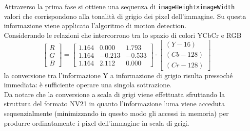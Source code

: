 Attraverso la prima fase si ottiene una sequenza di \texttt{imageHeight×imageWidth} valori che corrispondono alla tonalità di grigio dei pixel dell'immagine. Su questa informazione viene applicato l'algoritmo di motion detection.\\
Considerando le relazioni che intercorrono tra lo spazio di colori YCbCr e RGB
\[
\left[\begin{array}{c}R\\G\\B\end{array}\right] = \left[
\begin{array}{ccc}1.164&0.000&1.793\\1.164&-0.213&-0.533\\1.164&2.112&0.000\end{array}
\right]\cdot \left[\begin{array}{c}(Y-16)\\(Cb-128)\\(Cr-128)\end{array}\right]
\]
la conversione tra l'informazione Y a informazione di grigio risulta pressoché immediata: è sufficiente operare una singola sottrazione.\\
Da notare che la conversione a scala di grigi viene effettuata sfruttando la struttura del formato NV21 in quanto l'informazione luma viene acceduta sequenzialmente (minimizzando in questo modo gli accessi in memoria) per produrre ordinatamente i pixel dell'immagine in scala di grigi.\\

